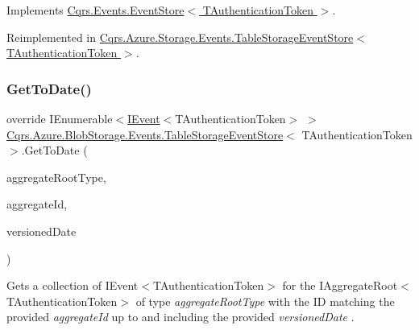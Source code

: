 Implements \hyperlink{classCqrs_1_1Events_1_1EventStore_a0096646f5dff730b0041b9469719c420_a0096646f5dff730b0041b9469719c420}{Cqrs.\+Events.\+Event\+Store$<$ T\+Authentication\+Token $>$}.



Reimplemented in \hyperlink{classCqrs_1_1Azure_1_1Storage_1_1Events_1_1TableStorageEventStore_a1b436bbb111b14b85ee6ba7f90fb1a35_a1b436bbb111b14b85ee6ba7f90fb1a35}{Cqrs.\+Azure.\+Storage.\+Events.\+Table\+Storage\+Event\+Store$<$ T\+Authentication\+Token $>$}.

\mbox{\label{classCqrs_1_1Azure_1_1BlobStorage_1_1Events_1_1TableStorageEventStore_a90fb91dfb58f69deb6f5e91bae69330d_a90fb91dfb58f69deb6f5e91bae69330d}} 
\subsubsection{\texorpdfstring{Get\+To\+Date()}{GetToDate()}}
{\footnotesize\ttfamily override I\+Enumerable$<$\hyperlink{interfaceCqrs_1_1Events_1_1IEvent}{I\+Event}$<$T\+Authentication\+Token$>$ $>$ \hyperlink{classCqrs_1_1Azure_1_1BlobStorage_1_1Events_1_1TableStorageEventStore}{Cqrs.\+Azure.\+Blob\+Storage.\+Events.\+Table\+Storage\+Event\+Store}$<$ T\+Authentication\+Token $>$.Get\+To\+Date (\begin{DoxyParamCaption}\item[{Type}]{aggregate\+Root\+Type,  }\item[{Guid}]{aggregate\+Id,  }\item[{Date\+Time}]{versioned\+Date }\end{DoxyParamCaption})\hspace{0.3cm}{\ttfamily [virtual]}}



Gets a collection of I\+Event$<$\+T\+Authentication\+Token$>$ for the I\+Aggregate\+Root$<$\+T\+Authentication\+Token$>$ of type {\itshape aggregate\+Root\+Type}  with the ID matching the provided {\itshape aggregate\+Id}  up to and including the provided {\itshape versioned\+Date} . 


